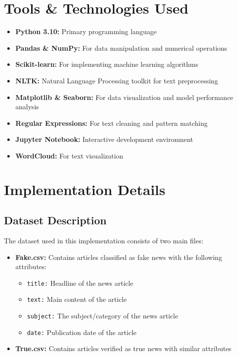 \documentclass[12pt]{article}
\begin{document}
\section{Tools \& Technologies Used}
\begin{itemize}
    \item \textbf{Python 3.10:} Primary programming language
    \item \textbf{Pandas \& NumPy:} For data manipulation and numerical operations
    \item \textbf{Scikit-learn:} For implementing machine learning algorithms
    \item \textbf{NLTK:} Natural Language Processing toolkit for text preprocessing
    \item \textbf{Matplotlib \& Seaborn:} For data visualization and model performance analysis
    \item \textbf{Regular Expressions:} For text cleaning and pattern matching
    \item \textbf{Jupyter Notebook:} Interactive development environment
    \item \textbf{WordCloud:} For text visualization
\end{itemize}

\section{Implementation Details}

\subsection{Dataset Description}
The dataset used in this implementation consists of two main files:

\begin{itemize}
    \item \textbf{Fake.csv:} Contains articles classified as fake news with the following attributes:
    \begin{itemize}
        \item \texttt{title:} Headline of the news article
        \item \texttt{text:} Main content of the article
        \item \texttt{subject:} The subject/category of the news article
        \item \texttt{date:} Publication date of the article
    \end{itemize}
    
    \item \textbf{True.csv:} Contains articles verified as true news with similar attributes
\end{itemize}
\end{document}
